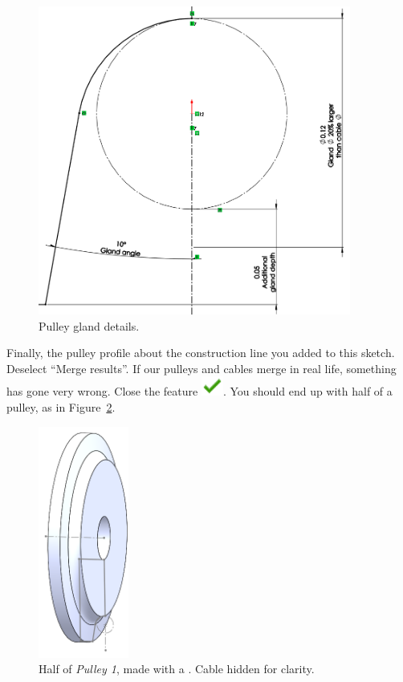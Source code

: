 \begin{figure}[H]
\begin{center}
\includegraphics[height=4in]{images/figures/pulley-gland-details.png}
\end{center}
\caption{Pulley gland details. \label{fig:pulley-gland}}

\end{figure}

Finally,  the pulley profile about the construction line you added to
this sketch. Deselect ``Merge results''. If our pulleys and cables merge in real
life, something has gone very wrong. Close the feature
\includegraphics{images/symbols/green-check.png}. You should end up with half of a pulley, as
in Figure~\ref{fig:pulley-1-revolve}.

\begin{figure}[H]
\begin{center}
\includegraphics[height=3in]{images/figures/pulley-1-revolve.png}
\end{center}
\caption{Half of \emph{Pulley 1}, made with a . Cable hidden for clarity.
\label{fig:pulley-1-revolve}}

\end{figure}

